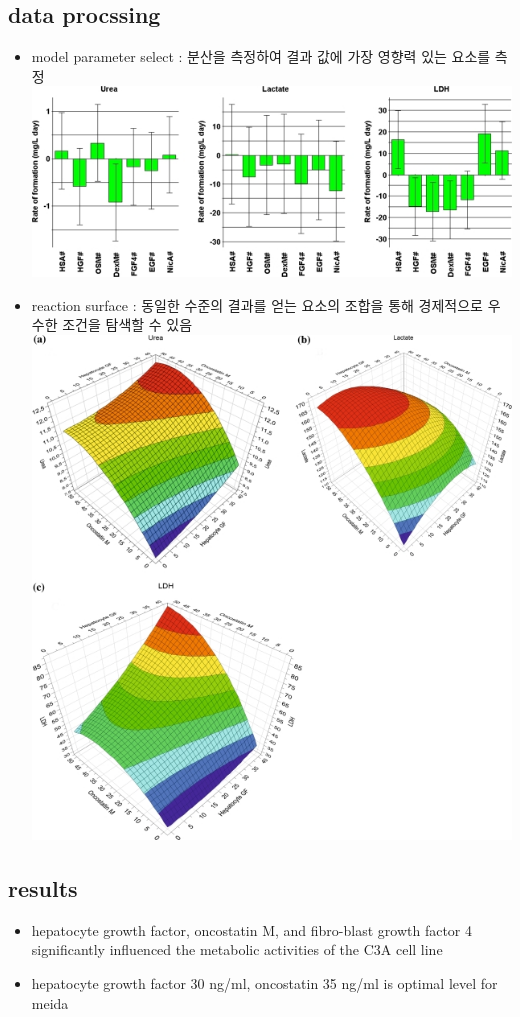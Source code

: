 \documentclass{article}
\begin{document}
\subsection{data procssing}
\begin{itemize}
    \item model parameter select : 분산을 측정하여 결과 값에 가장 영향력 있는 요소를 측정\\ \includegraphics[scale=0.5]{variance.jpg}
    \item reaction surface : 동일한 수준의 결과를 얻는 요소의 조합을 통해 경제적으로 우수한 조건을 탐색할 수 있음\\ \includegraphics[scale=0.3]{reactionsurfae.jpg}
\end{itemize}
\subsection{results}
\begin{itemize}
    \item hepatocyte growth factor, oncostatin M, and fibro-blast growth factor 4 significantly influenced the metabolic activities of the C3A cell line
    \item hepatocyte growth factor 30 ng/ml, oncostatin 35 ng/ml is optimal level for meida
\end{itemize}

    
\end{document}
